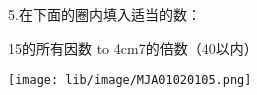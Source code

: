 \question 5.在下面的圈内填入适当的数：

\hspace{4cm}15的所有因数 \hbox to 4cm{}7的倍数（40以内）
\begin{center}
    \texttt{[image: lib/image/MJA01020105.png]}
\end{center}